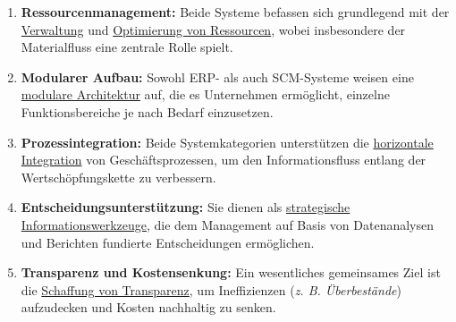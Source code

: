 \begin{enumerate}[label=\arabic*.), leftmargin=*]
    \item \textbf{Ressourcenmanagement:} Beide Systeme befassen sich grundlegend mit der \uline{Verwaltung} und \uline{Optimierung von Ressourcen}, wobei insbesondere der Materialfluss eine zentrale Rolle spielt. \cite{44}\cite{45}\cite{46}
    \item \textbf{Modularer Aufbau:} Sowohl \acs{ERP}- als auch \acs{SCM}-Systeme weisen eine \uline{modulare Architektur} auf, die es Unternehmen ermöglicht, einzelne Funktionsbereiche je nach Bedarf einzusetzen. \cite{47}\cite{48}
    \item \textbf{Prozessintegration:} Beide Systemkategorien unterstützen die \uline{horizontale Integration} von Geschäftsprozessen, um den Informationsfluss entlang der Wertschöpfungskette zu verbessern. \cite{49}\cite{50}\cite{51}\cite{52}
    \item \textbf{Entscheidungsunterstützung:} Sie dienen als \uline{strategische Informationswerkzeuge}, die dem Management auf Basis von Datenanalysen und Berichten fundierte Entscheidungen ermöglichen. \cite{53}\cite{54}
    \item \textbf{Transparenz und Kostensenkung:} Ein wesentliches gemeinsames Ziel ist die \uline{Schaffung von Transparenz}, um Ineffizienzen (\textit{\acs{z. B.} Überbestände}) aufzudecken und Kosten nachhaltig zu senken. \cite{55}\cite{56}\cite{57}
    \end{enumerate}

